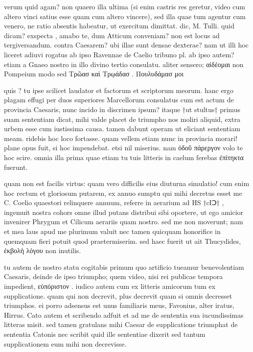  verum quid agam? non quaero illa ultima (si enim castris res geretur, video cum altero vinci satius esse quam cum altero vincere), sed illa quae tum agentur cum venero, ne ratio absentis habeatur, ut exercitum dimittat. dic, M. Tulli. quid dicam? exspecta , amabo te, dum Atticum conveniam? non est locus ad tergiversandum. contra Caesarem? ubi illae sunt densae dexterae? nam ut illi hoc liceret adiuvi rogatus ab ipso Ravennae de Caelio tribuno pl. ab ipso autem? etiam a Gnaeo nostro in illo divino tertio consulatu. aliter sensero; αἰδέομαι non Pompeium modo sed Τρῶασ καὶ Τρῳάδασ . Πουλυδάμασ μοι

 quis ? tu ipse scilicet laudator et factorum et scriptorum meorum. hanc ergo plagam effugi per duos superiores Marcellorum consulatus cum est actum de provincia Caesaris, nunc incido in discrimen ipsum? itaque †ut stultus† primus suam sententiam dicat, mihi valde placet de triumpho nos moliri aliquid, extra urbem esse cum iustissima causa. tamen dabunt operam ut eliciant sententiam meam. ridebis hoc loco fortasse. quam vellem etiam nunc in provincia morari! plane opus fuit, si hoc impendebat. etsi nil miserius. nam ὁδοῦ πάρεργον volo te hoc scire. omnia illa prima quae etiam tu tuis litteris in caelum ferebas ἐπίτηκτα fuerunt.

 quam non est facilis virtus: quam vero difficilis eius diuturna simulatio! cum enim hoc rectum et gloriosum putarem, ex annuo sumptu qui mihi decretus esset me C. Coelio quaestori relinquere annuum, referre in aerarium ad HS †cIↃ† , ingemuit nostra cohors omne illud putans distribui sibi oportere, ut ego amicior invenirer Phrygum et Cilicum aerariis quam nostro. sed me non moverunt; nam et mea laus apud me plurimum valuit nec tamen quicquam honorifice in quemquam fieri potuit quod praetermiserim. sed haec fuerit ut ait Thucydides, ἐκβολὴ λόγου non inutilis.

 tu autem de nostro statu cogitabis primum quo artificio tueamur benevolentiam Caesaris, deinde de ipso triumpho; quem video, nisi rei publicae tempora impedient, εὐπόριστον . iudico autem cum ex litteris amicorum tum ex supplicatione. quam qui non decrevit, plus decrevit quam si omnis decresset triumphos. ei porro adsensus est unus familiaris meus, Favonius, alter iratus, Hirrus. Cato autem et scribendo adfuit et ad me de sententia sua iucundissimas litteras misit. sed tamen gratulans mihi Caesar de supplicatione triumphat de sententia Catonis nec scribit quid ille sententiae dixerit sed tantum supplicationem eum mihi non decrevisse.

